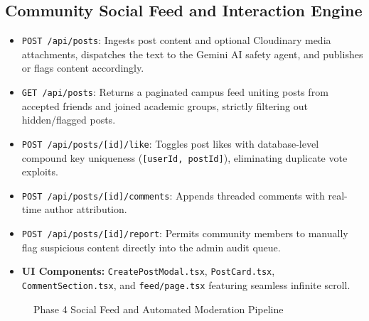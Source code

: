 \documentclass[11pt,a4paper]{report}
\begin{document}
\subsection{Community Social Feed and Interaction Engine}

\begin{itemize}
    \item \texttt{POST /api/posts}: Ingests post content and optional Cloudinary media attachments, dispatches the text to the Gemini AI safety agent, and publishes or flags content accordingly.
    \item \texttt{GET /api/posts}: Returns a paginated campus feed uniting posts from accepted friends and joined academic groups, strictly filtering out hidden/flagged posts.
    \item \texttt{POST /api/posts/[id]/like}: Toggles post likes with database-level compound key uniqueness (\texttt{[userId, postId]}), eliminating duplicate vote exploits.
    \item \texttt{POST /api/posts/[id]/comments}: Appends threaded comments with real-time author attribution.
    \item \texttt{POST /api/posts/[id]/report}: Permits community members to manually flag suspicious content directly into the admin audit queue.
    \item \textbf{UI Components:} \texttt{CreatePostModal.tsx}, \texttt{PostCard.tsx}, \texttt{CommentSection.tsx}, and \texttt{feed/page.tsx} featuring seamless infinite scroll.
\end{itemize}

\begin{figure}[htbp]
\centering
{}
\caption{Phase 4 Social Feed and Automated Moderation Pipeline}
\label{fig:phase4-pipeline}
\end{figure}
\end{document}
